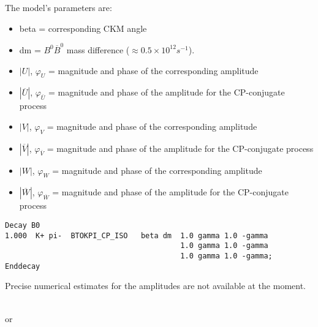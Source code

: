 The model's parameters are:
\begin{itemize}
\item
beta = corresponding CKM angle
\item
dm = $B^{0} \overline{B}^{0}$ mass difference ($\approx 0.5 \times 10^{12} s^{-1}$).  
\item
$|U|$, $\varphi_{U}$  = magnitude and phase of the corresponding amplitude
\item
$|\overline{U}|$, $\varphi_{\overline{U}}$ = magnitude and phase of the amplitude for the CP-conjugate process
\item
$|V|$, $\varphi_{V}$  = magnitude and phase of the corresponding amplitude
\item
$|\overline{V}|$, $\varphi_{\overline{V}}$ = magnitude and phase of the amplitude for the CP-conjugate process
\item
$|W|$, $\varphi_{W}$  = magnitude and phase of the corresponding amplitude
\item
$|\overline{W}|$, $\varphi_{\overline{W}}$ = magnitude and phase of the amplitude for the CP-conjugate process
\end{itemize}

\Example

\begin{verbatim}
Decay B0
1.000  K+ pi-  BTOKPI_CP_ISO   beta dm  1.0 gamma 1.0 -gamma 
                                        1.0 gamma 1.0 -gamma 
                                        1.0 gamma 1.0 -gamma; 
Enddecay
\end{verbatim}

\Notes
Precise numerical estimates for the amplitudes are not available at the moment.



\label{btoxsgamma}


\\
or\\

